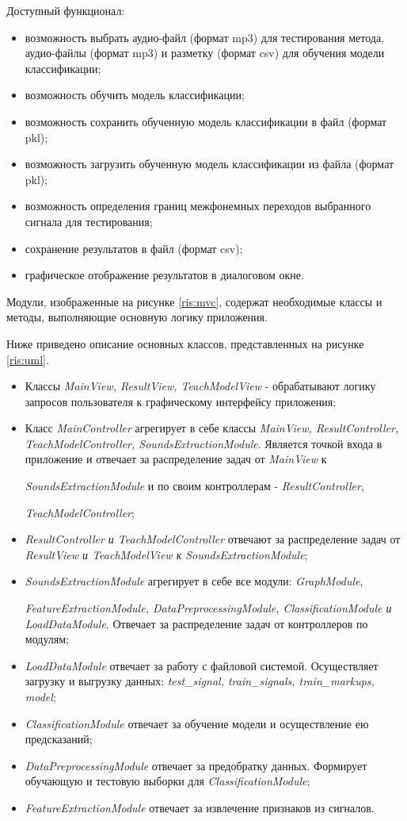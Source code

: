 \documentclass[utf8x, 14pt, oneside, a4paper]{article}
\begin{document}
	Доступный функционал:
	\begin{itemize}
		\item возможность выбрать аудио-файл (формат mp3) для тестирования метода, аудио-файлы (формат mp3) и разметку (формат csv) для обучения модели классификации;
		\item возможность обучить модель классификации;
		\item возможность сохранить обученную модель классификации в файл (формат pkl);
		\item возможность загрузить обученную модель классификации из файла (формат pkl);
		\item возможность определения границ межфонемных переходов выбранного сигнала для тестирования;
		\item сохранение результатов в файл (формат csv);
		\item графическое отображение результатов в диалоговом окне.
	\end{itemize}
	
	Модули, изображенные на рисунке \ref{ris:mvc}, содержат необходимые классы и методы, выполняющие основную логику приложения.
	
	Ниже приведено описание основных классов, представленных на рисунке \ref{ris:uml}.
	
	\begin{itemize}
		\item Классы \textit{MainView, ResultView, TeachModelView} - обрабатывают логику запросов пользователя к графическому интерфейсу приложения;
		\item Класс \textit{MainController} агрегирует в себе классы \textit{MainView, ResultController, TeachModelController, SoundsExtractionModule}. Является точкой входа в приложение и отвечает за распределение задач от \textit{MainView} к 
		
		\textit{SoundsExtractionModule} и по своим контроллерам - \textit{ResultController},
		
		\textit{TeachModelController};
		\item \textit{ResultController и TeachModelController} отвечают за распределение задач от \textit{ResultView и TeachModelView к SoundsExtractionModule};
		\item \textit{SoundsExtractionModule} агрегирует в себе все модули: \textit{GraphModule},
			
		\textit{FeatureExtractionModule, DataPreprocessingModule, ClassificationModule и LoadDataModule}. Отвечает за распределение задач от контроллеров по модулям;
		\item \textit{LoadDataModule} отвечает за работу с файловой системой. Осуществляет загрузку и выгрузку данных: \textit{test\_signal, train\_signals, train\_markups, model};
		\item \textit{ClassificationModule} отвечает за обучение модели и осуществление ею предсказаний;
		\item \textit{DataPreprocessingModule} отвечает за предобратку данных. Формирует обучающую и тестовую выборки для \textit{ClassificationModule};
		\item \textit{FeatureExtractionModule} отвечает за извлечение признаков из сигналов.
	\end{itemize}
	
\end{document}
